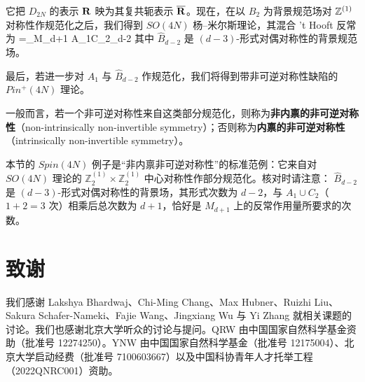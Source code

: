 \begin{center}
\end{center}
它把 $D_{2N}$ 的表示 $\mathbf{R}$ 映为其复共轭表示 $\overline{\mathbf{R}}$。现在，在以 $B_2$ 为背景规范场对 $\mathbb{Z}^{(1)}$ 对称性作规范化之后，我们得到 $SO(4N)$ 杨–米尔斯理论，其混合 't Hooft 反常为
\be
{}=\pi\int_{M_{d+1}} A_1\cup C_2\cup {}_{d-2}
\ee
其中 $\hat{B}_{d-2}$ 是 $(d-3)$-形式对偶对称性的背景规范场。

最后，若进一步对 $A_1$ 与 $\hat{B}_{d-2}$ 作规范化，我们将得到带非可逆对称性缺陷的 $Pin^+(4N)$ 理论。

一般而言，若一个非可逆对称性来自这类部分规范化，则称为\textbf{非内禀的非可逆对称性}（non-intrinsically non-invertible symmetry）；否则称为\textbf{内禀的非可逆对称性}（intrinsically non-invertible symmetry）。

\begin{yizhu}
本节的 $Spin(4N)$ 例子是“非内禀非可逆对称性”的标准范例：它来自对 $SO(4N)$ 理论的 $\mathbb{Z}_2^{(1)}\times\mathbb{Z}_2^{(1)}$ 中心对称性作部分规范化。核对时请注意：
$\hat{B}_{d-2}$ 是 $(d-3)$-形式对偶对称性的背景场，其形式次数为 $d-2$，与 $A_1\cup C_2$（$1+2=3$ 次）相乘后总次数为 $d+1$，恰好是 $M_{d+1}$ 上的反常作用量所要求的次数。
\end{yizhu}

\section*{致谢}

我们感谢 Lakshya Bhardwaj、Chi-Ming Chang、Max Hubner、Ruizhi Liu、Sakura Schafer-Nameki、Fajie Wang、Jingxiang Wu 与 Yi Zhang 就相关课题的讨论。我们也感谢北京大学听众的讨论与提问。QRW 由中国国家自然科学基金资助（批准号 12274250）。YNW 由中国国家自然科学基金（批准号 12175004）、北京大学启动经费（批准号 7100603667）以及中国科协青年人才托举工程（2022QNRC001）资助。
